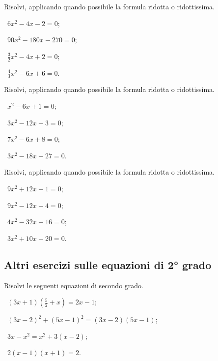 \begin{esercizio}[\Ast]
 \label{ese:3.22}
Risolvi, applicando quando possibile la formula ridotta o ridottissima.
\begin{multicols}{2}
 \begin{enumeratea}
 \item~$6 x^{2}-4 x-2 = 0$;
 \item~$90 x^{2}-180 x-270 = 0$;
 \item~$\frac{3}{2} x^{2}-4 x + 2 = 0$;
 \item~$\frac{4}{3} x^{2}-6 x + 6 = 0$.
 \end{enumeratea}
 \end{multicols}
\end{esercizio}

\begin{esercizio}[\Ast]
\label{ese:3.23}
Risolvi, applicando quando possibile la formula ridotta o ridottissima.
\begin{multicols}{2}
 \begin{enumeratea}
 \item~$x^{2}-6 x + 1 = 0$;
 \item~$3 x^{2}-12 x-3 = 0$;
 \item~$7 x^{2}-6 x + 8 = 0$;
 \item~$3 x^{2}-18 x + 27 = 0$.
 \end{enumeratea}
 \end{multicols}
\end{esercizio}
\newpage
\begin{esercizio}[\Ast]
\label{ese:3.24}
Risolvi, applicando quando possibile la formula ridotta o ridottissima.
\begin{multicols}{2}
 \begin{enumeratea}
 \item~$9 x^{2} + 12 x + 1 = 0$;
 \item~$9 x^{2}-12 x + 4 = 0$;
 \item~$4 x^{2}-32 x + 16 = 0$;
 \item~$3 x^{2} + 10 x + 20 = 0$.
 \end{enumeratea}
 \end{multicols}
\end{esercizio}

\subsection*{Altri esercizi sulle equazioni di 2° grado}

\begin{esercizio}[\Ast]
\label{ese:3.25}
Risolvi le seguenti equazioni di secondo grado.
\begin{multicols}{2}
 \begin{enumeratea}
 \item~$(3 x + 1) \left(\frac{5}{2} + x \right) = 2 x-1$;
 \item~$(3 x-2)^{2} + (5 x-1)^{2} = (3 x-2) (5 x-1)$;
 \item~$3 x-x^{2} = x^{2} + 3 (x-2)$;
 \item~$2 (x-1) (x + 1) = 2$.
 \end{enumeratea}
 \end{multicols}
\end{esercizio}

